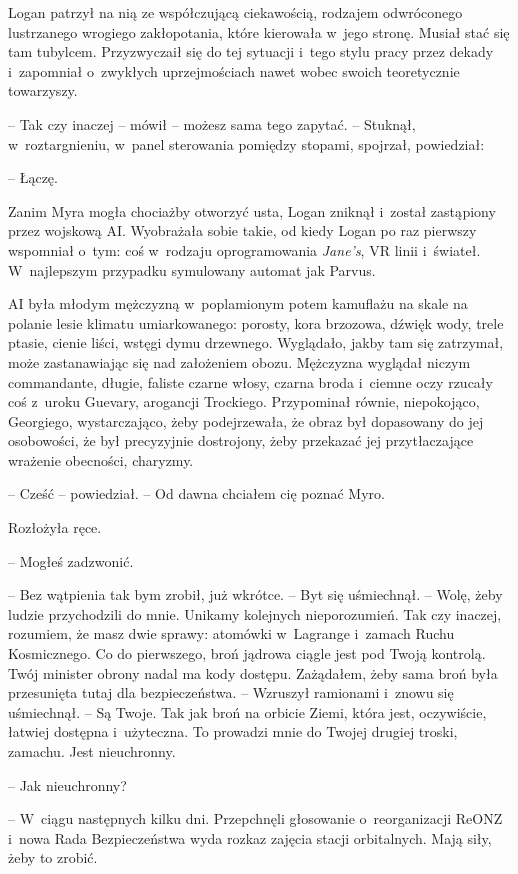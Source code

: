 \documentclass[oneside,polish,11pt,sfheadings]{mwbk}
\begin{document}
Logan patrzył na nią ze współczującą ciekawością, rodzajem odwróconego
lustrzanego wrogiego zakłopotania, które kierowała w~jego stronę. Musiał
stać się tam tubylcem. Przyzwyczaił się do tej sytuacji i~tego stylu
pracy przez dekady i~zapomniał o~zwykłych uprzejmościach nawet wobec
swoich teoretycznie towarzyszy.

-- Tak czy inaczej -- mówił -- możesz sama tego zapytać. -- Stuknął, w~roztargnieniu, w~panel sterowania pomiędzy stopami, spojrzał,
powiedział: 

-- Łączę.

Zanim Myra mogła chociażby otworzyć usta, Logan zniknął i~został
zastąpiony przez wojskową AI. Wyobrażała sobie takie, od kiedy Logan po
raz pierwszy wspomniał o~tym: coś w~rodzaju oprogramowania
\textit{Jane's}, VR linii i~świateł. W~najlepszym przypadku symulowany
automat jak Parvus.

AI była młodym mężczyzną w~poplamionym potem kamuflażu na skale na
polanie lesie klimatu umiarkowanego: porosty, kora brzozowa, dźwięk
wody, trele ptasie, cienie liści, wstęgi dymu drzewnego. Wyglądało,
jakby tam się zatrzymał, może zastanawiając się nad założeniem obozu.
Mężczyzna wyglądał niczym commandante, długie, faliste czarne włosy,
czarna broda i~ciemne oczy rzucały coś z~uroku Guevary, arogancji
Trockiego. Przypominał równie, niepokojąco, Georgiego, wystarczająco,
żeby podejrzewała, że obraz był dopasowany do jej osobowości, że był
precyzyjnie dostrojony, żeby przekazać jej przytłaczające wrażenie
obecności, charyzmy.

-- Cześć -- powiedział. -- Od dawna chciałem cię poznać Myro.

Rozłożyła ręce. 

-- Mogłeś zadzwonić.

-- Bez wątpienia tak bym zrobił, już wkrótce. -- Byt się uśmiechnął. -- Wolę, żeby ludzie przychodzili do mnie. Unikamy kolejnych nieporozumień.
Tak czy inaczej, rozumiem, że masz dwie sprawy: atomówki w~Lagrange i~zamach Ruchu Kosmicznego. Co do pierwszego, broń jądrowa ciągle jest pod
Twoją kontrolą. Twój minister obrony nadal ma kody dostępu. Zażądałem,
żeby sama broń była przesunięta tutaj dla bezpieczeństwa. -- Wzruszył
ramionami i~znowu się uśmiechnął. -- Są Twoje. Tak jak broń na orbicie
Ziemi, która jest, oczywiście, łatwiej dostępna i~użyteczna. To prowadzi
mnie do Twojej drugiej troski, zamachu. Jest nieuchronny.

-- Jak nieuchronny?

-- W~ciągu następnych kilku dni. Przepchnęli głosowanie o~reorganizacji
ReONZ i~nowa Rada Bezpieczeństwa wyda rozkaz zajęcia stacji orbitalnych.
Mają siły, żeby to zrobić.
\end{document}
